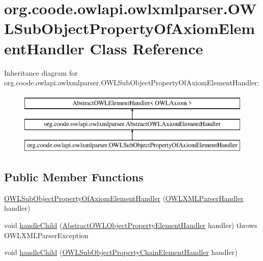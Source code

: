 \hypertarget{classorg_1_1coode_1_1owlapi_1_1owlxmlparser_1_1_o_w_l_sub_object_property_of_axiom_element_handler}{\section{org.\-coode.\-owlapi.\-owlxmlparser.\-O\-W\-L\-Sub\-Object\-Property\-Of\-Axiom\-Element\-Handler Class Reference}
\label{classorg_1_1coode_1_1owlapi_1_1owlxmlparser_1_1_o_w_l_sub_object_property_of_axiom_element_handler}
}
Inheritance diagram for org.\-coode.\-owlapi.\-owlxmlparser.\-O\-W\-L\-Sub\-Object\-Property\-Of\-Axiom\-Element\-Handler\-:\begin{figure}[H]
\begin{center}
\leavevmode
\includegraphics[height=3.000000cm]{classorg_1_1coode_1_1owlapi_1_1owlxmlparser_1_1_o_w_l_sub_object_property_of_axiom_element_handler}
\end{center}
\end{figure}
\subsection*{Public Member Functions}
\begin{DoxyCompactItemize}
\item 
\hyperlink{classorg_1_1coode_1_1owlapi_1_1owlxmlparser_1_1_o_w_l_sub_object_property_of_axiom_element_handler_a7c88d8f6259851f62e38426691fb0625}{O\-W\-L\-Sub\-Object\-Property\-Of\-Axiom\-Element\-Handler} (\hyperlink{classorg_1_1coode_1_1owlapi_1_1owlxmlparser_1_1_o_w_l_x_m_l_parser_handler}{O\-W\-L\-X\-M\-L\-Parser\-Handler} handler)
\item 
void \hyperlink{classorg_1_1coode_1_1owlapi_1_1owlxmlparser_1_1_o_w_l_sub_object_property_of_axiom_element_handler_a890e5d87a603769589baea21d0c5f745}{handle\-Child} (\hyperlink{classorg_1_1coode_1_1owlapi_1_1owlxmlparser_1_1_abstract_o_w_l_object_property_element_handler}{Abstract\-O\-W\-L\-Object\-Property\-Element\-Handler} handler)  throws O\-W\-L\-X\-M\-L\-Parser\-Exception 
\item 
void \hyperlink{classorg_1_1coode_1_1owlapi_1_1owlxmlparser_1_1_o_w_l_sub_object_property_of_axiom_element_handler_a9a876c58376ebc5ad4256e67b08531e3}{handle\-Child} (\hyperlink{classorg_1_1coode_1_1owlapi_1_1owlxmlparser_1_1_o_w_l_sub_object_property_chain_element_handler}{O\-W\-L\-Sub\-Object\-Property\-Chain\-Element\-Handler} handler)
\end{DoxyCompactItemize}
